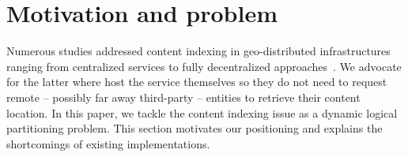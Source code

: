 \section{Motivation and problem}
\label{sec:background}


Numerous studies addressed content indexing in geo-distributed
infrastructures ranging from centralized services to fully
decentralized approaches~\cite{squirrel}. We advocate for the latter
where \processes host the service themselves so they do not need to
request remote -- possibly far away third-party -- entities to
retrieve their content location.  In this paper, we tackle the content
indexing issue as a dynamic logical partitioning problem. This section
motivates our positioning and explains the shortcomings of existing
implementations.


